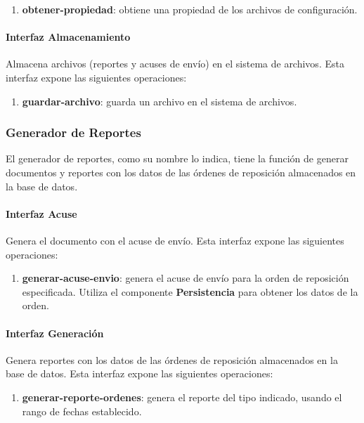 \begin{enumerate}
	\item \textbf{obtener-propiedad}: obtiene una propiedad de los archivos de configuración.
\end{enumerate}

\pagebreak

\paragraph{\indent Interfaz Almacenamiento\\}
Almacena archivos (reportes y acuses de envío) en el sistema de archivos. Esta interfaz expone las siguientes operaciones:
\begin{enumerate}
	\item \textbf{guardar-archivo}: guarda un archivo en el sistema de archivos.
\end{enumerate}

\subsubsection{Generador de Reportes}
El generador de reportes, como su nombre lo indica, tiene la función de generar documentos y reportes con los datos de las órdenes de reposición almacenados en la base de datos. 
\paragraph{\indent Interfaz Acuse\\} Genera el documento con el acuse de envío. Esta interfaz expone las siguientes operaciones:
\begin{enumerate}
	\item \textbf{generar-acuse-envio}: genera el acuse de envío para la orden de reposición especificada. Utiliza el componente \textbf{Persistencia} para obtener los datos de la orden.
\end{enumerate}

\paragraph{\indent Interfaz Generación\\} Genera reportes con los datos de las órdenes de reposición almacenados en la base de datos. Esta interfaz expone las siguientes operaciones:
\begin{enumerate}
	\item \textbf{generar-reporte-ordenes}: genera el reporte del tipo indicado, usando el rango de fechas establecido.
\end{enumerate}

